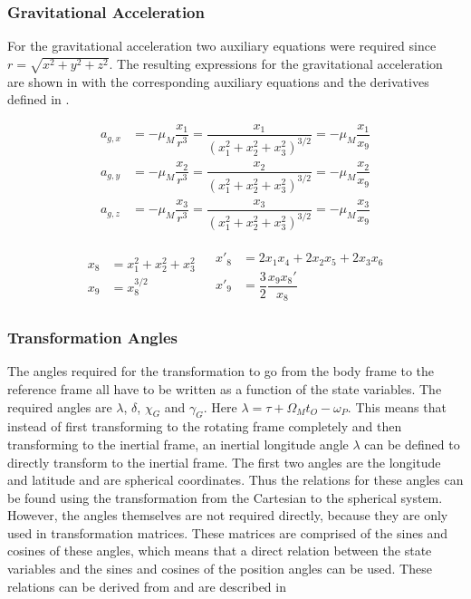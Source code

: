 \subsubsection{Gravitational Acceleration}
 \label{subsubsec:tsiGravity} 
 For the gravitational acceleration two auxiliary equations were required since $r=\sqrt{x^{2}+y^{2}+z^{2}}$. The resulting expressions for the gravitational acceleration are shown in  with the corresponding auxiliary equations and the derivatives defined in .
 
 \begin{equation} \label{eq:gravAcc}
\begin{split}
a_{g,x} &= -\mu_{M}\dfrac{x_{1}}{r^{3}} = \dfrac{x_{1}}{\left(x_{1}^{2}+x_{2}^{2}+x_{3}^{2} \right)^{3/2}}=-\mu_{M}\dfrac{x_{1}}{x_{9}}\\
a_{g,y} &= -\mu_{M}\dfrac{x_{2}}{r^{3}} = \dfrac{x_{2}}{\left(x_{1}^{2}+x_{2}^{2}+x_{3}^{2} \right)^{3/2}}=-\mu_{M}\dfrac{x_{2}}{x_{9}}\\
a_{g,z} &= -\mu_{M}\dfrac{x_{3}}{r^{3}} = \dfrac{x_{3}}{\left(x_{1}^{2}+x_{2}^{2}+x_{3}^{2} \right)^{3/2}}=-\mu_{M}\dfrac{x_{3}}{x_{9}}
\end{split}
\end{equation}

\begin{align} \label{eq:gravAux}
\begin{split} 
x_{8}&=x_{1}^{2}+x_{2}^{2}+x_{3}^{2}\\
x_{9}&=x_{8}^{3/2}
\end{split} 
&
\begin{split}
x'_{8}&=2x_{1}x_{4}+2x_{2}x_{5}+2x_{3}x_{6}\\
x'_{9}&=\dfrac{3}{2}\dfrac{x_{9}x_{8}'}{x_{8}}
\end{split}
\end{align}
 
 
 
\subsubsection{Transformation Angles}
\label{subsubsec:tsiTransAngl}
The angles required for the transformation to go from the body frame to the reference frame all have to be written as a function of the state variables. The required angles are $\lambda$, $\delta$, $\chi_{G}$ and $\gamma_{G}$. Here $\lambda = \tau + \Omega_{M}t_{O}-\omega_{P}$. This means that instead of first transforming to the rotating frame completely and then transforming to the inertial frame, an inertial longitude angle $\lambda$ can be defined to directly transform to the inertial frame. The first two angles are the longitude and latitude and are spherical coordinates. Thus the relations for these angles can be found using the transformation from the Cartesian to the spherical system. However, the angles themselves are not required directly, because they are only used in transformation matrices. These matrices are comprised of the sines and cosines of these angles, which means that a direct relation between the state variables and the sines and cosines of the position angles can be used. These relations can be derived from  and are described in 


